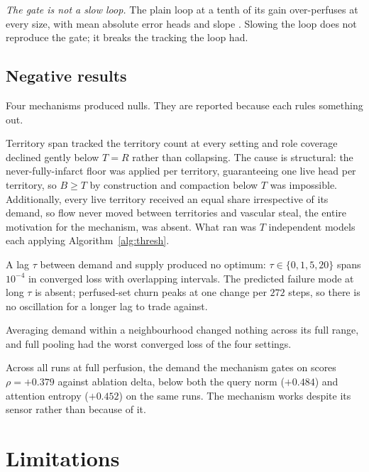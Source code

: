 \documentclass[11pt]{report}
\theoremstyle{plain}
\theoremstyle{definition}
\theoremstyle{remark}
\begin{document}
\emph{The gate is not a slow loop.} The plain loop at a tenth of its gain over-perfuses at
every size, with mean absolute error \numSlowMae{} heads and slope \numSlowSlope{}.
Slowing the loop does not reproduce the gate; it breaks the tracking the loop had.

\subsection{Negative results}

Four mechanisms produced nulls. They are reported because each rules something out.

\begin{description}\itemsep2pt
\item[Territory compaction.] Territory span tracked the territory count at every setting
  and role coverage declined gently below $T = R$ rather than collapsing. The cause is
  structural: the never-fully-infarct floor was applied per territory, guaranteeing one
  live head per territory, so $B \ge T$ by construction and compaction below $T$ was
  impossible. Additionally, every live territory received an equal share irrespective of
  its demand, so flow never moved between territories and vascular steal, the entire
  motivation for the mechanism, was absent. What ran was $T$ independent models each
  applying Algorithm~\ref{alg:thresh}.
\item[Delay.] A lag $\tau$ between demand and supply produced no optimum: $\tau \in
  \{0,1,5,20\}$ spans $10^{-4}$ in converged loss with overlapping intervals. The
  predicted failure mode at long $\tau$ is absent; perfused-set churn peaks at one change
  per $272$ steps, so there is no oscillation for a longer lag to trade against.
\item[Pooled demand.] Averaging demand within a neighbourhood changed nothing across its
  full range, and full pooling had the worst converged loss of the four settings.
\item[The gating signal is not the best predictor of importance.] Across all runs at full
  perfusion, the demand the mechanism gates on scores $\rho = +0.379$ against ablation
  delta, below both the query norm ($+0.484$) and attention entropy ($+0.452$) on the same
  runs. The mechanism works despite its sensor rather than because of it.
\end{description}

\section{Limitations}
\end{document}
